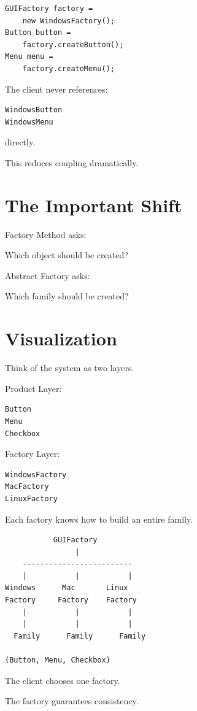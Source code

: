 \documentclass[11pt,a4paper]{book}
\begin{document}
\begin{verbatim}
GUIFactory factory =
    new WindowsFactory();
Button button =
    factory.createButton();
Menu menu =
    factory.createMenu();
\end{verbatim}

The client never references:

\begin{verbatim}
WindowsButton
WindowsMenu
\end{verbatim}

directly.

This reduces coupling dramatically.
\section{The Important Shift}

\begin{idea}

Factory Method asks:

\begin{center}
Which object should be created?
\end{center}

Abstract Factory asks:

\begin{center}
Which family should be created?
\end{center}

\end{idea}
\section{Visualization}

\begin{mentalmodel}

Think of the system as two layers.

Product Layer:

\begin{verbatim}
Button
Menu
Checkbox
\end{verbatim}

Factory Layer:

\begin{verbatim}
WindowsFactory
MacFactory
LinuxFactory
\end{verbatim}

Each factory knows how to build an entire family.

\begin{verbatim}
           GUIFactory
                |
    -------------------------
    |           |           |
Windows      Mac       Linux
Factory     Factory    Factory
    |           |           |
    |           |           |
  Family      Family      Family

(Button, Menu, Checkbox)
\end{verbatim}

The client chooses one factory.

The factory guarantees consistency.

\end{mentalmodel}
\end{document}
